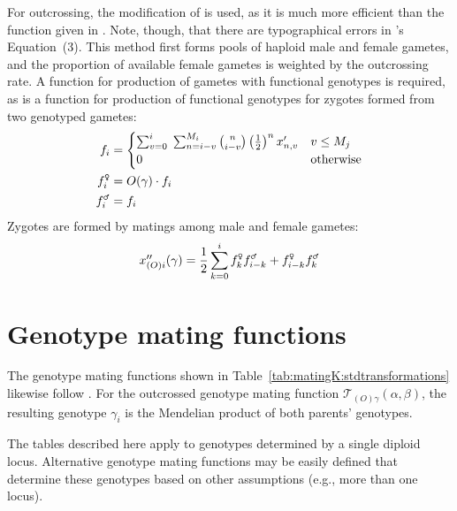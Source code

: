 \documentclass[12pt,twoside,letterpaper,fleqn]{report}
\numberwithin{equation}{section}  %
\newcommand{\gami}{\mbox{$f_{i}$}}
\newcommand{\gammalei}{\mbox{$f_{i}^{\text{\Male}}$}}
\newcommand{\gamfemalei}{\mbox{$f_{i}^{\text{\Female}}$}}
\newcommand{\gammalek}{\mbox{$f_{k}^{\text{\Male}}$}}
\newcommand{\gamfemalek}{\mbox{$f_{k}^{\text{\Female}}$}}
\newcommand{\gammaleik}{\mbox{$f_{i-k}^{\text{\Male}}$}}
\newcommand{\gamfemaleik}{\mbox{$f_{i-k}^{\text{\Female}}$}}
\newcommand{\Mj}{\mbox{$M_{j}$}}
\newcommand{\xpnv}{\mbox{$x'_{n,v}$}}
\newcommand{\xppoig}{\mbox{$x''_{(O)i}(\gamma)$}}
\newcommand{\Og}{\mbox{$O(\gamma)$}}
\newcommand{\TOgab}{\mbox{$\mathcal{T}_{(O)\gamma}(\alpha, \beta)$}}
\begin{document}
{For outcrossing, the modification of \citet{Charlesworth:1990:5337} is used, as it is much more efficient than the function given in \citet{Kondrashov:1985:5375}.  Note, though, that there are typographical errors in \citeauthor{Charlesworth:1990:5337}'s Equation~(3).  This method first forms pools of haploid male and female gametes, and the proportion of available female gametes is weighted by the outcrossing rate.  A function for production of gametes with functional genotypes is required, as is a function for production of functional genotypes for zygotes formed from two genotyped gametes:
\begin{align}
\label{eq:Kreproduction:gametes}
\gami    &= \begin{cases}
              \sum_{v=0}^{i}{
                \;  \sum_{n=i-v}^{M_i}{
                \binom{n}{i-v} \left(\frac{1}{2}\right)^{n} \xpnv
              }} & v \le \Mj \\
              0 & \text{otherwise}
            \end{cases} \\
\gamfemalei &= \Og \cdot \gami \\
\gammalei &= \gami
\end{align}
Zygotes are formed by matings among male and female gametes:
\begin{equation}
\label{eq:Kreproduction:zygotes}
\xppoig = \frac{1}{2} \sum_{k=0}^{i}{\gamfemalek\gammaleik+\gamfemaleik\gammalek}
\end{equation}

\section{Genotype mating functions}

The genotype mating functions shown in Table~\ref{tab:matingK:stdtransformations} likewise follow \citet{Kondrashov:1985:5375}.  For the outcrossed genotype mating function \TOgab, the resulting genotype $\gamma_i$ is the Mendelian product of both parents' genotypes.

The tables described here apply to genotypes determined by a single diploid locus.  Alternative genotype mating functions may be easily defined that determine these genotypes based on other assumptions (e.g., more than one locus).

}
\end{document}
